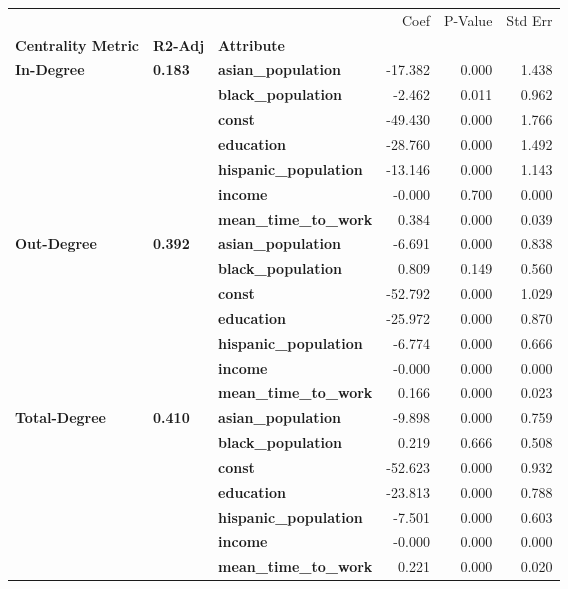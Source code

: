 \begin{tabular}{lllrrr}
\toprule
             &       &                   &    Coef &  P-Value &  Std Err \\
\textbf{Centrality Metric} & \textbf{R2-Adj} & \textbf{Attribute} &         &          &          \\
\midrule
\multirow{7}{*}{\textbf{In-Degree}} & \multirow{7}{*}{\textbf{0.183}} & \textbf{asian\_population} & -17.382 &    0.000 &    1.438 \\
             &       & \textbf{black\_population} &  -2.462 &    0.011 &    0.962 \\
             &       & \textbf{const} & -49.430 &    0.000 &    1.766 \\
             &       & \textbf{education} & -28.760 &    0.000 &    1.492 \\
             &       & \textbf{hispanic\_population} & -13.146 &    0.000 &    1.143 \\
             &       & \textbf{income} &  -0.000 &    0.700 &    0.000 \\
             &       & \textbf{mean\_time\_to\_work} &   0.384 &    0.000 &    0.039 \\
\cline{1-6}
\cline{2-6}
\multirow{7}{*}{\textbf{Out-Degree}} & \multirow{7}{*}{\textbf{0.392}} & \textbf{asian\_population} &  -6.691 &    0.000 &    0.838 \\
             &       & \textbf{black\_population} &   0.809 &    0.149 &    0.560 \\
             &       & \textbf{const} & -52.792 &    0.000 &    1.029 \\
             &       & \textbf{education} & -25.972 &    0.000 &    0.870 \\
             &       & \textbf{hispanic\_population} &  -6.774 &    0.000 &    0.666 \\
             &       & \textbf{income} &  -0.000 &    0.000 &    0.000 \\
             &       & \textbf{mean\_time\_to\_work} &   0.166 &    0.000 &    0.023 \\
\cline{1-6}
\cline{2-6}
\multirow{7}{*}{\textbf{Total-Degree}} & \multirow{7}{*}{\textbf{0.410}} & \textbf{asian\_population} &  -9.898 &    0.000 &    0.759 \\
             &       & \textbf{black\_population} &   0.219 &    0.666 &    0.508 \\
             &       & \textbf{const} & -52.623 &    0.000 &    0.932 \\
             &       & \textbf{education} & -23.813 &    0.000 &    0.788 \\
             &       & \textbf{hispanic\_population} &  -7.501 &    0.000 &    0.603 \\
             &       & \textbf{income} &  -0.000 &    0.000 &    0.000 \\
             &       & \textbf{mean\_time\_to\_work} &   0.221 &    0.000 &    0.020 \\
\bottomrule
\end{tabular}

